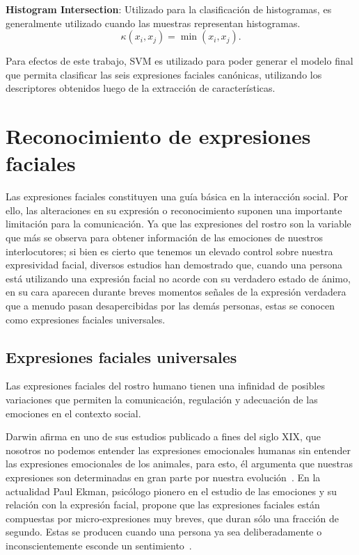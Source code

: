 	\textbf{Histogram Intersection}: Utilizado para la clasificación de histogramas, es generalmente utilizado cuando las muestras representan histogramas.
	\begin{equation}
	\kappa(x_i,x_j) = \min(x_i,x_j).
	\label{k:Inter}
	\end{equation}


Para efectos de este trabajo, SVM es utilizado para poder generar el modelo final que permita clasificar las seis expresiones faciales canónicas, utilizando los descriptores obtenidos luego de la extracción de características.

\section{Reconocimiento de expresiones faciales}
\label{sec:fer}
Las expresiones faciales constituyen una guía básica en la interacción social. Por ello, las alteraciones en su expresión o reconocimiento suponen una importante limitación para la comunicación. Ya que las expresiones del rostro son la variable que más se observa para obtener información de las emociones de nuestros interlocutores; si bien es cierto que tenemos un elevado control sobre nuestra expresividad facial, diversos estudios han demostrado que, cuando una persona está utilizando una expresión facial no acorde con su verdadero estado de ánimo, en su cara aparecen durante breves momentos señales de la expresión verdadera que a menudo pasan desapercibidas por las demás personas, estas se conocen como expresiones faciales universales.


\subsection{Expresiones faciales universales}
\label{sec:type_fe}

Las expresiones faciales del rostro humano tienen una infinidad de posibles variaciones que permiten la comunicación, regulación y adecuación de las emociones en el contexto social.

Darwin afirma en uno de  sus estudios publicado a fines del siglo XIX, que nosotros no podemos entender las expresiones emocionales humanas sin entender las expresiones emocionales de los animales, para esto, él argumenta que nuestras expresiones son determinadas en gran parte por nuestra evolución~\cite{Darwin1956,Darwin1998}. En la actualidad Paul Ekman, psicólogo pionero en el estudio de las emociones y su relación con la expresión facial, propone que las expresiones faciales están compuestas por micro-expresiones muy breves, que duran sólo una fracción de segundo. Estas se producen cuando una persona ya sea deliberadamente o inconscientemente esconde un sentimiento~\cite{Ekman1981}.

